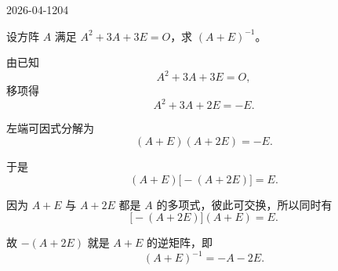 \begin{mistake}{2026-04-12}{04}

\begin{problemcontent}
设方阵 \(A\) 满足 \(A^2+3A+3E=O\)，求 \((A+E)^{-1}\)。

\end{problemcontent}

\begin{solutioncontent}
由已知
\[
A^2+3A+3E=O,
\]
移项得
\[
A^2+3A+2E=-E.
\]

左端可因式分解为
\[
(A+E)(A+2E)=-E.
\]

于是
\[
(A+E)\bigl[-(A+2E)\bigr]=E.
\]

因为 \(A+E\) 与 \(A+2E\) 都是 \(A\) 的多项式，彼此可交换，所以同时有
\[
\bigl[-(A+2E)\bigr](A+E)=E.
\]

故 \(-(A+2E)\) 就是 \(A+E\) 的逆矩阵，即
\[
(A+E)^{-1}=-A-2E.
\]

\end{solutioncontent}


\end{mistake}
